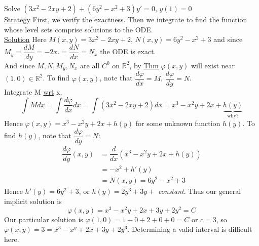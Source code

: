 \begin{example-N}
	Solve $(3x^2-2xy+2) + (6y^2 - x^2 + 3)y' = 0$, $y(1)=0$\\
	\underline{\large Strategy} First, we verify the exactness. Then we integrate to find the function whose level sets comprise solutions to the ODE.\\
	\underline{\large Solution} Here $M(x,y) = 3x^2 - 2xy + 2$, $N(x,y) = 6y^2 - x^2 + 3$ and since $M_y = \dfrac{dM}{dy} = -2x. = \dfrac{dN}{dx} = N_x$ the ODE is exact.\\
	And since $M, N, M_y, N_x$ are all $C^0$ on $\mathbb{R}^2$, by \underline{Thm} $\varphi (x,y)$ will exist near $(1,0) \in \mathbb{R}^2$. To find $\varphi (x,y)$, note that $\dfrac{d \varphi}{dx} = M$, $\dfrac{d \varphi}{dy} = N$.\\
	Integrate M \underline{wrt} x.
	\begin{equation*}
		\int M dx = \int \dfrac{d \varphi}{dx} dx = \int (3x^2 -2xy + 2)dx = x^3 -x^2y + 2x + \underbrace{h(y)}_{\text{why?}}
	\end{equation*}
	Hence $\varphi (x,y) = x^3 -x^2y + 2x + h(y)$ for some unknown function $h(y)$. To find $h(y)$, note that $\dfrac{d \varphi}{dy} = N$:
	\begin{align*}
		\dfrac{d \varphi}{dy}(x,y) & = \dfrac{d}{dx}(x^3 - x^2y + 2x + h(y))\\
		& = -x^2 + h'(y)\\
		& = N(x,y) = 6y^2 - x^2 + 3
	\end{align*}
	Hence $h'(y) = 6y^2 + 3$, or $h(y) = 2y^3 + 3y +$ \textit{constant}. Thus our general implicit solution is 
	\begin{equation*}
		\varphi(x,y) = x^3 - x^2y + 2x + 3y + 2y^2 = C
	\end{equation*}
	Our particular solution is $\varphi (1,0) = 1-0+2+0+0 = C$ or $c=3$, so $\varphi(x,y) = 3 = x^3 -x^y + 2x +3y +2y^3$. Determining a valid interval is difficult here. 
\end{example-N}
